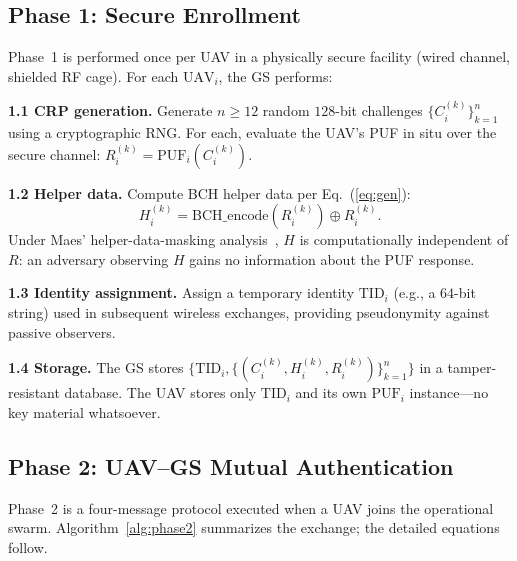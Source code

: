 \documentclass[journal,a4paper,10pt]{IEEEtran}
\begin{document}
\subsection{Phase 1: Secure Enrollment}
Phase~1 is performed once per UAV in a physically secure facility
(wired channel, shielded RF cage). For each $\mathrm{UAV}_i$, the GS
performs:

\textbf{1.1 CRP generation.} Generate $n{\ge}12$ random $128$-bit
challenges $\{C_i^{(k)}\}_{k=1}^{n}$ using a cryptographic RNG. For
each, evaluate the UAV's PUF in situ over the secure channel:
$R_i^{(k)} = \mathrm{PUF}_i(C_i^{(k)})$.

\textbf{1.2 Helper data.} Compute BCH helper data per
Eq.~(\ref{eq:gen}):
\begin{equation}
H_i^{(k)} = \mathrm{BCH\_encode}(R_i^{(k)}) \oplus R_i^{(k)}.
\end{equation}
Under Maes' helper-data-masking analysis~\cite{helper_data_masking},
$H$ is computationally independent of $R$: an adversary observing $H$
gains no information about the PUF response.

\textbf{1.3 Identity assignment.} Assign a temporary identity
$\mathrm{TID}_i$ (e.g., a $64$-bit string) used in subsequent wireless
exchanges, providing pseudonymity against passive observers.

\textbf{1.4 Storage.} The GS stores
$\{\mathrm{TID}_i, \{(C_i^{(k)}, H_i^{(k)}, R_i^{(k)})\}_{k=1}^{n}\}$
in a tamper-resistant database. The UAV stores only $\mathrm{TID}_i$
and its own $\mathrm{PUF}_i$ instance---no key material whatsoever.

\subsection{Phase 2: UAV--GS Mutual Authentication}
Phase~2 is a four-message protocol executed when a UAV joins the
operational swarm. Algorithm~\ref{alg:phase2} summarizes the exchange;
the detailed equations follow.
\end{document}
